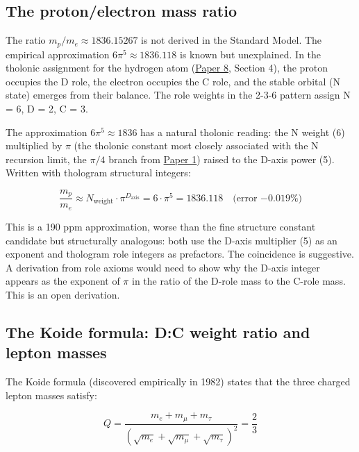 \documentclass[12pt]{article}
\begin{document}
\subsection{The proton/electron mass ratio}\label{the-protonelectron-mass-ratio}

The ratio \(m_p / m_e \approx 1836.15267\) is not derived in the
Standard Model. The empirical approximation \(6\pi^5 \approx 1836.118\)
is known but unexplained. In the tholonic assignment for the hydrogen
atom
(\href{https://github.com/baardev/truevalue/blob/main/docnav/Research/papers/8_atom-as-tholon-measurable-phenomena/8_atom-as-tholon-measurable-phenomena.pdf}{Paper
8}, Section 4), the proton occupies the D role, the electron occupies
the C role, and the stable orbital (N state) emerges from their balance.
The role weights in the 2-3-6 pattern assign N = 6, D = 2, C = 3.

The approximation \(6\pi^5 \approx 1836\) has a natural tholonic
reading: the N weight (6) multiplied by \(\pi\) (the tholonic constant
most closely associated with the N recursion limit, the \(\pi/4\) branch
from
\href{https://github.com/baardev/truevalue/blob/main/docnav/Research/papers/1_recursive-tholonic-five-constants/1_recursive-tholonic-five-constants.pdf}{Paper
1}) raised to the D-axis power (5). Written with thologram structural
integers:

\[\frac{m_p}{m_e} \approx N_{\text{weight}} \cdot \pi^{D_{\text{axis}}} = 6 \cdot \pi^5 = 1836.118 \quad \text{(error } {-0.019\%)}\]

This is a 190 ppm approximation, worse than the fine structure constant
candidate but structurally analogous: both use the D-axis multiplier (5)
as an exponent and thologram role integers as prefactors. The
coincidence is suggestive. A derivation from role axioms would need to
show why the D-axis integer appears as the exponent of \(\pi\) in the
ratio of the D-role mass to the C-role mass. This is an open derivation.

\subsection{The Koide formula: D:C weight ratio and lepton masses}\label{the-koide-formula-dc-weight-ratio-and-lepton-masses}

The Koide formula (discovered empirically in 1982) states that the three
charged lepton masses satisfy:

\[Q = \frac{m_e + m_\mu + m_\tau}{(\sqrt{m_e} + \sqrt{m_\mu} + \sqrt{m_\tau})^2} = \frac{2}{3}\]
\end{document}
